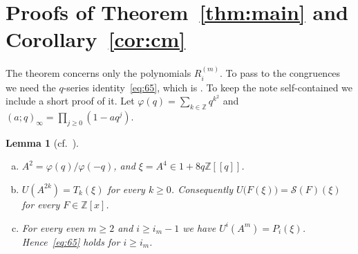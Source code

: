 \documentclass[11pt]{amsart}
\newtheorem{lemma}[theorem]{Lemma}
\theoremstyle{definition}
\theoremstyle{remark}
\newcommand{\Z}{\mathbb{Z}}
\newcommand{\Sop}{\mathcal{S}}
\begin{document}
\section{Proofs of Theorem~\texorpdfstring{\ref{thm:main}}{1.2} and Corollary~\texorpdfstring{\ref{cor:cm}}{1.3}}\label{sec:proof}

The theorem concerns only the polynomials $R^{(m)}_i$. To pass to the congruences we need the $q$-series identity~\eqref{eq:65}, which is \cite[(6.5)]{ST}. To keep the note self-contained we include a short proof of it. Let $\varphi(q)=\sum_{k\in\Z}q^{k^2}$ and $(a;q)_\infty=\prod_{j\ge0}(1-aq^j)$.

\begin{lemma}[{cf.\ \cite[(2.16), (6.3)]{ST}}]\label{lem:Uiden}
\begin{enumerate}[(a)]
\item $A^2=\varphi(q)/\varphi(-q)$, and $\xi=A^4\in1+8q\Z[[q]]$.
\item $U(A^{2k})=T_k(\xi)$ for every $k\ge0$. Consequently $U\big(F(\xi)\big)=\Sop(F)(\xi)$ for every $F\in\Z[x]$.
\item For every even $m\ge2$ and $i\ge i_m-1$ we have $U^i(A^m)=P_i(\xi)$. Hence~\eqref{eq:65} holds for $i\ge i_m$.
\end{enumerate}
\end{lemma}
\end{document}
